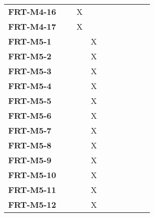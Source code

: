 \documentclass[12pt, titlepage]{article}
\begin{document}
\begin{longtable}{|l|ccccccc|}
	\textbf{FRT-M4-16} & ~                                        & X           & ~           & ~           & ~           & ~           & ~           \\
	\textbf{FRT-M4-17} & ~                                        & X           & ~           & ~           & ~           & ~           & ~           \\
	\textbf{FRT-M5-1}  & ~                                        & ~           & X           & ~           & ~           & ~           & ~           \\
	\textbf{FRT-M5-2}  & ~                                        & ~           & X           & ~           & ~           & ~           & ~           \\
	\textbf{FRT-M5-3}  & ~                                        & ~           & X           & ~           & ~           & ~           & ~           \\
	\textbf{FRT-M5-4}  & ~                                        & ~           & X           & ~           & ~           & ~           & ~           \\
	\textbf{FRT-M5-5}  & ~                                        & ~           & X           & ~           & ~           & ~           & ~           \\
	\textbf{FRT-M5-6}  & ~                                        & ~           & X           & ~           & ~           & ~           & ~           \\
	\textbf{FRT-M5-7}  & ~                                        & ~           & X           & ~           & ~           & ~           & ~           \\
	\textbf{FRT-M5-8}  & ~                                        & ~           & X           & ~           & ~           & ~           & ~           \\
	\textbf{FRT-M5-9}  & ~                                        & ~           & X           & ~           & ~           & ~           & ~           \\
	\textbf{FRT-M5-10} & ~                                        & ~           & X           & ~           & ~           & ~           & ~           \\
	\textbf{FRT-M5-11} & ~                                        & ~           & X           & ~           & ~           & ~           & ~           \\
	\textbf{FRT-M5-12} & ~                                        & ~           & X           & ~           & ~           & ~           & ~           \\

\end{longtable}
\end{document}

